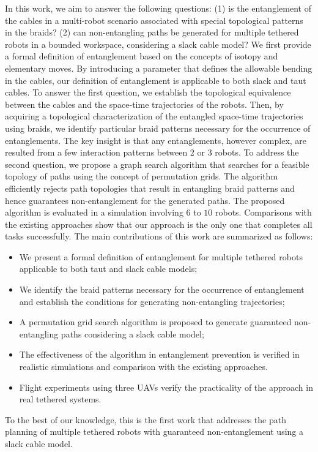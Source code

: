 \documentclass[conference]{IEEEtran}
\begin{document}
In this work, we aim to answer the following questions: (1) is the entanglement of the cables in a multi-robot scenario associated with special topological patterns in the braids? (2) 
can non-entangling paths be generated for multiple tethered robots in a bounded workspace, considering a slack cable model?
We first provide a formal definition of entanglement based on the concepts of isotopy and elementary moves.
By introducing a parameter that defines the allowable bending in the cables, our definition of entanglement is applicable to both slack and taut cables.
To answer the first question, we establish the topological equivalence between the cables and the space-time trajectories of the robots. 
Then, by acquiring a topological characterization of the entangled space-time trajectories using braids, 
we identify particular braid patterns necessary for the occurrence of entanglements.
The key insight is that any entanglements, however complex, are resulted from a few interaction patterns between $2$ or $3$ robots. 
To address the second question, we propose a graph search algorithm that searches for a feasible topology of paths using the concept of permutation grids.
The algorithm efficiently rejects path topologies that result in entangling braid patterns and hence guarantees non-entanglement for the generated paths.
The proposed algorithm is evaluated in a simulation involving $6$ to $10$ robots.
Comparisons with the existing approaches show that our approach is the only one that completes all tasks successfully.
The main contributions of this work are summarized as follows:
\begin{itemize}
    \item We present a formal definition of entanglement for multiple tethered robots applicable to both taut and slack cable models;
    \item We identify the braid patterns necessary for the occurrence of entanglement and establish the conditions for generating non-entangling trajectories;
    \item A permutation grid search algorithm is proposed to generate guaranteed non-entangling paths considering a slack cable model;
    \item The effectiveness of the algorithm in entanglement prevention is verified in realistic simulations and comparison with the existing approaches.
    \item Flight experiments using three UAVs verify the practicality of the approach in real tethered systems.
\end{itemize}
To the best of our knowledge, this is the first work that addresses the path planning of multiple tethered robots with guaranteed non-entanglement using a slack cable model. 
\end{document}

